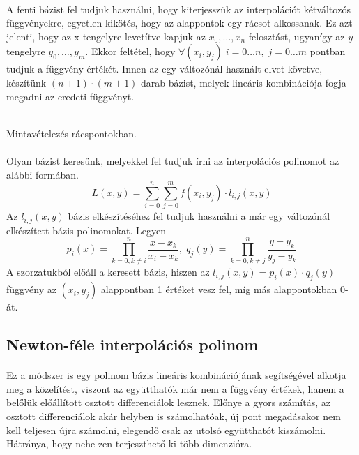 \documentclass{elteikthesis}
\begin{document}
\paragraph{}
A fenti bázist fel tudjuk használni, hogy kiterjesszük az interpolációt kétváltozós függvényekre, egyetlen kikötés, hogy az alappontok egy rácsot alkossanak. Ez azt jelenti, hogy az x tengelyre levetítve kapjuk az $x_0, \dots, x_n$ felosztást, ugyanígy az $y$ tengelyre $y_0, \dots, y_m$. Ekkor feltétel, hogy $\forall (x_i, y_j) \; i = 0 \dots n, \; j = 0 \dots m$ pontban tudjuk a függvény értékét. Innen az egy változónál használt elvet követve, készítünk $(n+1) \cdot (m+1)$ darab bázist, melyek lineáris kombinációja fogja megadni az eredeti függvényt.
\begin{center}

 \\
{\footnotesize Mintavételezés rácspontokban.}

\end{center}
\paragraph{}
Olyan bázist keresünk, melyekkel fel tudjuk írni az interpolációs polinomot az alábbi formában.
$$L(x, y) = \sum_{i=0}^{n}\sum_{j=0}^{m}f(x_i, y_j) \cdot l_{i, j}(x, y)$$
Az $l_{i, j}(x,y)$ bázis elkészítéséhez fel tudjuk használni a már egy változónál elkészített bázis polinomokat. Legyen $$p_i(x) = \prod_{k = 0, k \neq i}^{n}\frac{x-x_k}{x_i-x_k},\; q_j(y) = \prod_{k = 0, k \neq j}^{n}\frac{y-y_k}{y_j-y_k}$$ A szorzatukból előáll a keresett bázis, hiszen az $l_{i, j}(x,y) = p_i(x)\cdot q_j(y)$ függvény az $(x_i, y_j)$ alappontban 1 értéket vesz fel, míg más alappontokban 0-át.
\subsection{Newton-féle interpolációs polinom}
\paragraph{}
Ez a módszer is egy polinom bázis lineáris kombinációjának segítségével alkotja meg a közelítést, viszont az együtthatók már nem a függvény értékek, hanem a belőlük előállított osztott differenciálok lesznek. Előnye a gyors számítás, az osztott differenciálok akár helyben is számolhatóak, új pont megadásakor nem kell teljesen újra számolni, elegendő csak az utolsó együtthatót kiszámolni. Hátránya, hogy nehe-zen terjeszthető ki több dimenzióra.
\end{document}
